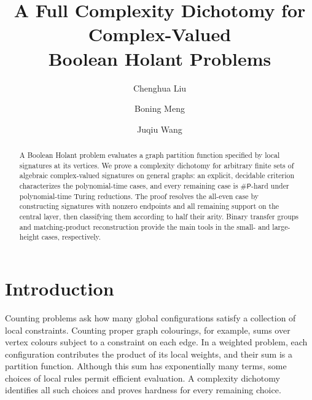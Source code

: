 \documentclass[11pt,letterpaper,onecolumn]{article}
\theoremstyle{plain}
\theoremstyle{definition}
\theoremstyle{remark}
\newcommand{\SharpP}{\#\mathsf P}
\begin{document}
\title{A Full Complexity Dichotomy for Complex-Valued\\[0.15em]
		Boolean Holant Problems}
	\author[1,*]{Chenghua Liu}
	\author[2,\textdagger]{Boning Meng}
	\author[1,\textdaggerdbl]{Juqiu Wang}
	
	
	
	\date{}

\hypersetup{pageanchor=false}
\begin{titlepage}
\maketitle
\thispagestyle{empty}
	
	
	\begin{abstract}\normalsize
		A Boolean Holant problem evaluates a graph partition function specified
        by local signatures at its vertices.  We prove a complexity dichotomy
        for arbitrary finite sets of algebraic complex-valued signatures on
        general graphs: an explicit, decidable criterion characterizes the
        polynomial-time cases, and every remaining case is \(\SharpP\)-hard
        under polynomial-time Turing reductions.  The proof resolves the
        all-even case by constructing signatures with nonzero endpoints and
        all remaining support on the central layer, then classifying them
        according to half their arity. Binary transfer groups and matching-product
        reconstruction provide the main tools in the small- and large-height cases,
        respectively.
	\end{abstract}
\end{titlepage}

\clearpage
{}
\hypersetup{pageanchor=true}

\section{Introduction}
\label{short:sec:introduction}

Counting problems ask how many global configurations satisfy a collection
of local constraints. Counting proper graph colourings, for example,
sums over vertex colours subject to a constraint on each edge. In a
weighted problem, each configuration contributes the product of its local
weights, and their sum is a partition function. Although this sum has
exponentially many terms, some choices of local rules permit efficient
evaluation. A complexity dichotomy identifies all such choices and proves
hardness for every remaining choice.
\end{document}
